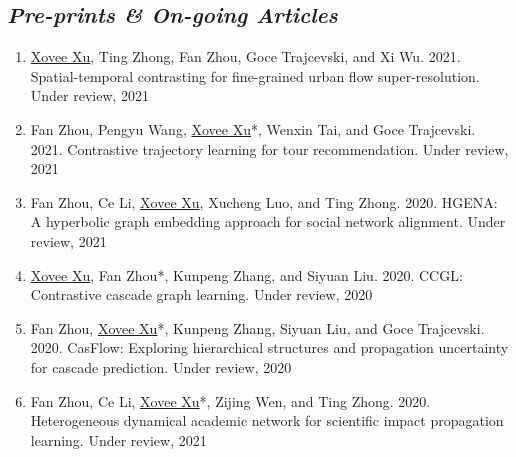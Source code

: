 \subsection*{\textnormal{\textit{Pre-prints \& On-going Articles}}}

\begin{enumerate}[resume]
    \item \underline{Xovee Xu}, Ting Zhong, Fan Zhou, Goce Trajcevski, and Xi Wu. 2021. Spatial-temporal contrasting for fine-grained urban flow super-resolution. Under review, 2021
    \item Fan Zhou, Pengyu Wang, \underline{Xovee Xu}*, Wenxin Tai, and Goce Trajcevski. 2021. Contrastive trajectory learning for tour recommendation. Under review, 2021
    \item Fan Zhou, Ce Li, \underline{Xovee Xu}, Xucheng Luo, and Ting Zhong. 2020. HGENA: A hyperbolic graph embedding approach for social network alignment. Under review, 2021
    \item \underline{Xovee Xu}, Fan Zhou*, Kunpeng Zhang, and Siyuan Liu. 2020. CCGL: Contrastive cascade graph learning. Under review, 2020
    \item Fan Zhou, \underline{Xovee Xu}*, Kunpeng Zhang, Siyuan Liu, and Goce Trajcevski. 2020. CasFlow: Exploring hierarchical structures and propagation uncertainty for cascade prediction. Under review, 2020
    \item Fan Zhou, Ce Li, \underline{Xovee Xu}*, Zijing Wen, and Ting Zhong. 2020. Heterogeneous dynamical academic network for scientific impact propagation learning. Under review, 2021
\end{enumerate}